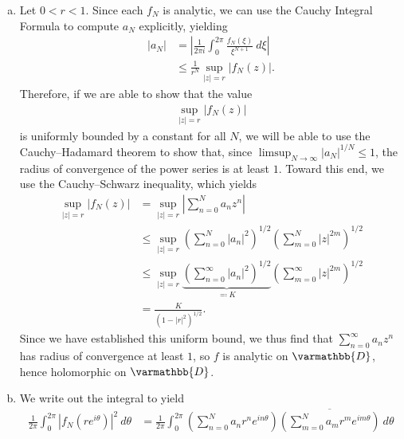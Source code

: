 \documentclass[10pt]{mypackage}
\renewcommand*{\mathbb}[1]{\varmathbb{#1}}
\begin{document}
\begin{solution}\hfill
  \begin{enumerate}[(a)]
    \item Let $ 0 < r < 1 $. Since each $f_N$ is analytic, we can use the Cauchy Integral Formula to compute $a_N$ explicitly, yielding
      \begin{align*}
        \left\vert a_N \right\vert &= \left\vert \frac{1}{2\pi i} \int_{0}^{2\pi} \frac{f_N\left( \xi \right)}{\xi^{N+1}}\:d\xi \right\vert\\
                                   &\leq \frac{1}{r^{N}} \sup_{|z| = r} \left\vert f_N\left( z \right) \right\vert.
      \end{align*}
      Therefore, if we are able to show that the value 
      \begin{align*}
        \sup_{|z| = r}\left\vert f_N\left( z \right) \right\vert
      \end{align*}
      is uniformly bounded by a constant for all $N$, we will be able to use the Cauchy--Hadamard theorem to show that, since $\limsup_{N\rightarrow\infty}\left\vert a_N \right\vert^{1/N}\leq 1$, the radius of convergence of the power series is at least $1$. Toward this end, we use the Cauchy--Schwarz inequality, which yields
      \begin{align*}
        \sup_{|z| = r} \left\vert f_N(z) \right\vert &= \sup_{|z| = r} \left\vert \sum_{n=0}^{N}a_nz^{n} \right\vert\\
                                                     &\leq \sup_{|z| = r} \left( \sum_{n=0}^{N} \left\vert a_n \right\vert^2 \right)^{1/2} \left( \sum_{m=0}^{N} \left\vert z \right\vert^{2m} \right)^{1/2}\\
                                                     &\leq \sup_{|z| = r} \underbrace{\left( \sum_{n=0}^{\infty}\left\vert a_n \right\vert^2 \right)^{1/2}}_{\eqcolon K} \left( \sum_{m=0}^{\infty}\left\vert z \right\vert^{2m} \right)^{1/2}\\
                                                     &= \frac{K}{\left( 1-|r|^2 \right)^{1/2}}.
      \end{align*}
      Since we have established this uniform bound, we thus find that $ \sum_{n=0}^{\infty}a_nz^{n} $ has radius of convergence at least $1$, so $f$ is analytic on $ \mathbb{D} $, hence holomorphic on $ \mathbb{D} $.
    \item We write out the integral to yield
      \begin{align*}
        \frac{1}{2\pi}\int_{0}^{2\pi} \left\vert f_N\left( re^{i\theta} \right) \right\vert^2\:d\theta &= \frac{1}{2\pi} \int_{0}^{2\pi} \left( \sum_{n=0}^{N} a_nr^{n}e^{in\theta} \right) \overline{\left( \sum_{m=0}^{N} a_mr^{m}e^{im\theta} \right)}\:d\theta\\

\end{align*}
\end{enumerate}
\end{solution}
\end{document}
